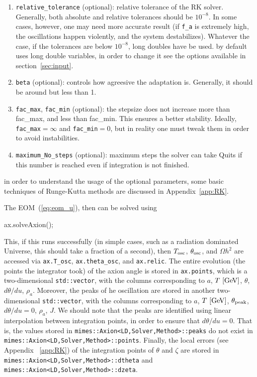 \documentclass[11pt,a4paper]{article}
\begin{document}
\begin{enumerate}
	\item {\tt relative\_tolerance} (optional): relative tolerance of the RK solver.
	Generally, both absolute and relative tolerances should be $10^{-8}$. 
	In some cases, however, one may need more accurate result (\eg if {\tt f\_a} is extremely high, 
	the oscillations happen violently, and the system destabilizes). Whatever the case, if the  
	tolerances are below $10^{-8}$, long doubles have be used. \mimes by default uses {long double} variables, 
	in order to change it see the options available in section~\ref{sec:input}.
	
	\item {\tt beta} (optional): controls how agreesive the adaptation is. Generally, it should be around but less than 1.
	
	\item {\tt fac\_max},  {\tt fac\_min} (optional): the stepsize does not increase more than fac\_max, and less than fac\_min. 
	This ensures a better stability. Ideally, {\tt fac\_max}$=\infty$ and {\tt fac\_min}$=0$, but in reality one must 
	tweak them in order to avoid instabilities.
	
	\item {\tt maximum\_No\_steps} (optional): maximum steps the solver can take Quits if this number is reached even if integration
	is not finished. 
\end{enumerate}
%
in order to understand the usage of the optional parameters, some basic techniques of Runge-Kutta methods are discussed in Appendix~\ref{app:RK}. 

The EOM~(\ref{eq:eom_u}), then can be solved using 
%
\begin{cpp}
	ax.solveAxion();
\end{cpp}
%
This, if this runs successfully (in simple cases, such as a radiation dominated Universe, this should take a fraction of a second), then  $T_{\rm osc}{}$, $\theta_{\rm osc}{}$, and $\Omega h^2$ are accessed via {\tt ax.T\_osc}, {\tt ax.theta\_osc}, and {\tt ax.relic}. The entire evolution (the points the integrator took) of the axion angle is stored in {\tt ax.points}, which is a two-dimensional {\tt std::vector}, with the columns corresponding to  $a$, $T~[{\rm GeV}]$, 
$\theta$, $d\theta/du$, $\rho_a$. Moreover, the peaks of he oscillation are stored in another two-dimensional {\tt std::vector}, with the columns corresponding to $a$, $T~[{\rm GeV}]$, $\theta_{\rm peak}{}$, $d\theta/du=0$, $\rho_a$, $J$. We should note that the peaks are identified using linear interpolation between integration points, in order to ensure that $d\theta/du = 0$. That is, the values stored in {\tt mimes::Axion<LD,Solver,Method>::peaks} do not exist in {\tt mimes::Axion<LD,Solver,Method>::points}. Finally, the local errors (see Appendix~
\ref{app:RK}) of the integration points of $\theta$ and $\zeta$ are stored in {\tt mimes::Axion<LD,Solver,Method>::dtheta} and {\tt mimes::Axion<LD,Solver,Method>::dzeta}.
\end{document}
